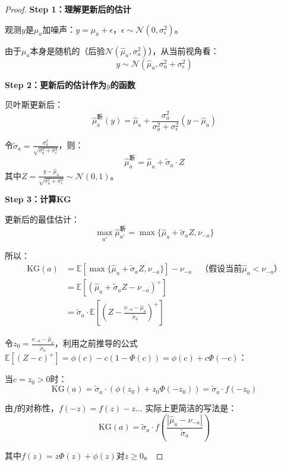 \documentclass[11pt,a4paper]{article}
\theoremstyle{definition}
\begin{document}
\begin{proof}
\textbf{Step 1：理解更新后的估计}

观测$y$是$\mu_a$加噪声：$y = \mu_a + \epsilon$，$\epsilon \sim \mathcal{N}(0, \sigma_\epsilon^2)$。

由于$\mu_a$本身是随机的（后验$\mathcal{N}(\hat{\mu}_a, \sigma_a^2)$），从当前视角看：
\[
y \sim \mathcal{N}(\hat{\mu}_a, \sigma_a^2 + \sigma_\epsilon^2)
\]

\textbf{Step 2：更新后的估计作为$y$的函数}

贝叶斯更新后：
\[
\hat{\mu}_a^{\text{新}}(y) = \hat{\mu}_a + \frac{\sigma_a^2}{\sigma_a^2 + \sigma_\epsilon^2}(y - \hat{\mu}_a)
\]

令$\tilde{\sigma}_a = \frac{\sigma_a^2}{\sqrt{\sigma_a^2 + \sigma_\epsilon^2}}$，则：
\[
\hat{\mu}_a^{\text{新}} = \hat{\mu}_a + \tilde{\sigma}_a \cdot Z
\]
其中$Z = \frac{y - \hat{\mu}_a}{\sqrt{\sigma_a^2 + \sigma_\epsilon^2}} \sim \mathcal{N}(0, 1)$。

\textbf{Step 3：计算KG}

更新后的最佳估计：
\[
\max_{a'} \hat{\mu}_{a'}^{\text{新}} = \max\{\hat{\mu}_a + \tilde{\sigma}_a Z, \nu_{-a}\}
\]

所以：
\begin{align*}
\text{KG}(a) &= \mathbb{E}[\max\{\hat{\mu}_a + \tilde{\sigma}_a Z, \nu_{-a}\}] - \nu_{-a} \quad \text{（假设当前}\hat{\mu}_a < \nu_{-a}\text{）} \\
&= \mathbb{E}[(\hat{\mu}_a + \tilde{\sigma}_a Z - \nu_{-a})^+] \\
&= \tilde{\sigma}_a \cdot \mathbb{E}\left[\left(Z - \frac{\nu_{-a} - \hat{\mu}_a}{\tilde{\sigma}_a}\right)^+\right]
\end{align*}

令$z_0 = \frac{\nu_{-a} - \hat{\mu}_a}{\tilde{\sigma}_a}$，利用之前推导的公式$\mathbb{E}[(Z - c)^+] = \phi(c) - c(1-\Phi(c)) = \phi(c) + c\Phi(-c)$：

当$c = z_0 > 0$时：
\[
\text{KG}(a) = \tilde{\sigma}_a \cdot (\phi(z_0) + z_0 \Phi(-z_0)) = \tilde{\sigma}_a \cdot f(-z_0)
\]

由$f$的对称性，$f(-z) = f(z) - z$... 实际上更简洁的写法是：
\[
\text{KG}(a) = \tilde{\sigma}_a \cdot f\left(\frac{|\hat{\mu}_a - \nu_{-a}|}{\tilde{\sigma}_a}\right)
\]

其中$f(z) = z\Phi(z) + \phi(z)$对$z \geq 0$。
\end{proof}
\end{document}
